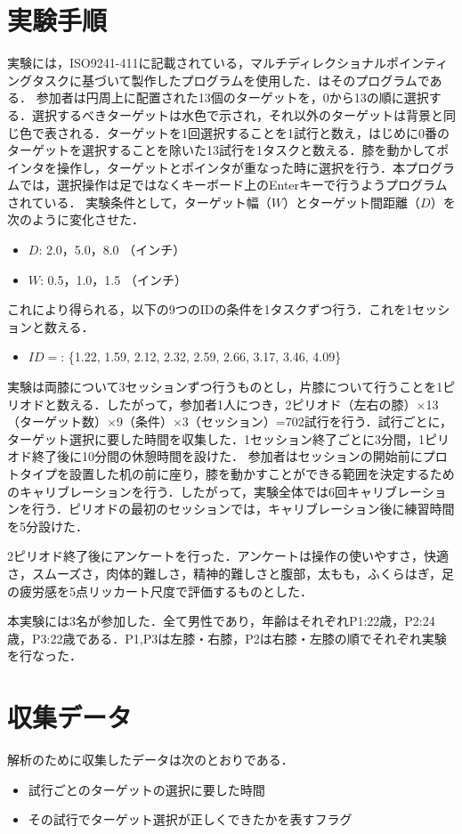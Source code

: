 \section{実験手順}
実験には，ISO9241-411に記載されている，マルチディレクショナルポインティングタスクに基づいて製作したプログラムを使用した．はそのプログラムである．
参加者は円周上に配置された13個のターゲットを，0から13の順に選択する．選択するべきターゲットは水色で示され，それ以外のターゲットは背景と同じ色で表される．ターゲットを1回選択することを1試行と数え，はじめに0番のターゲットを選択することを除いた13試行を1タスクと数える．膝を動かしてポインタを操作し，ターゲットとポインタが重なった時に選択を行う．本プログラムでは，選択操作は足ではなくキーボード上のEnterキーで行うようプログラムされている．
実験条件として，ターゲット幅（$W$）とターゲット間距離（$D$）を次のように変化させた．
\begin{itemize}
	\item $D$: 2.0，5.0，8.0 （インチ）
	\item $W$: 0.5，1.0，1.5 （インチ）
\end{itemize}
これにより得られる，以下の9つのIDの条件を1タスクずつ行う．これを1セッションと数える．
\begin{itemize}
	\item $ID = $: \{1.22, 1.59, 2.12, 2.32, 2.59, 2.66, 3.17,  3.46, 4.09\}
\end{itemize}
実験は両膝について3セッションずつ行うものとし，片膝について行うことを1ピリオドと数える．したがって，参加者1人につき，2ピリオド（左右の膝）$\times$13（ターゲット数）$\times$9（条件）$\times$3（セッション）=702試行を行う．試行ごとに，ターゲット選択に要した時間を収集した．1セッション終了ごとに3分間，1ピリオド終了後に10分間の休憩時間を設けた．
参加者はセッションの開始前にプロトタイプを設置した机の前に座り，膝を動かすことができる範囲を決定するためのキャリブレーションを行う．したがって，実験全体では6回キャリブレーションを行う．ピリオドの最初のセッションでは，キャリブレーション後に練習時間を5分設けた．

2ピリオド終了後にアンケートを行った．アンケートは操作の使いやすさ，快適さ，スムーズさ，肉体的難しさ，精神的難しさと腹部，太もも，ふくらはぎ，足の疲労感を5点リッカート尺度で評価するものとした．

本実験には3名が参加した．全て男性であり，年齢はそれぞれP1:22歳，P2:24歳，P3:22歳である．P1,P3は左膝・右膝，P2は右膝・左膝の順でそれぞれ実験を行なった．
\section{収集データ}
解析のために収集したデータは次のとおりである．
\begin{itemize}
	\item 試行ごとのターゲットの選択に要した時間
	\item その試行でターゲット選択が正しくできたかを表すフラグ
\end{itemize}


